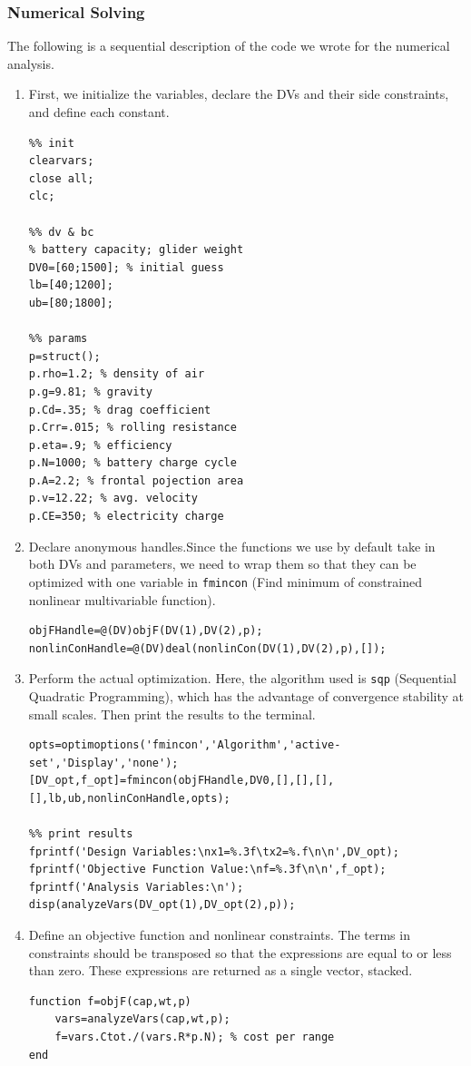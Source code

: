 \documentclass[11pt,twocolumn]{article}
\begin{document}
            \subsubsection{Numerical Solving}
                The following is a sequential description of the code we wrote for the numerical analysis.
                \begin{enumerate}
                    \item First, we initialize the variables, declare the DVs and their side constraints, and define each constant.
                    \begin{lstlisting}
%% init
clearvars;
close all;
clc;

%% dv & bc
% battery capacity; glider weight
DV0=[60;1500]; % initial guess
lb=[40;1200];
ub=[80;1800];

%% params
p=struct();
p.rho=1.2; % density of air
p.g=9.81; % gravity
p.Cd=.35; % drag coefficient
p.Crr=.015; % rolling resistance
p.eta=.9; % efficiency
p.N=1000; % battery charge cycle
p.A=2.2; % frontal pojection area
p.v=12.22; % avg. velocity
p.CE=350; % electricity charge
                    \end{lstlisting}
                    \item Declare anonymous handles.Since the functions we use by default take in both DVs and parameters, we need to wrap them so that they can be optimized with one variable in \texttt{fmincon} (Find minimum of constrained nonlinear multivariable function).
                    \begin{lstlisting}[firstnumber=last]
%% anonymous handles
objFHandle=@(DV)objF(DV(1),DV(2),p);
nonlinConHandle=@(DV)deal(nonlinCon(DV(1),DV(2),p),[]);
                    \end{lstlisting}
                    \item Perform the actual optimization. Here, the algorithm used is \texttt{sqp} (Sequential Quadratic Programming), which has the advantage of convergence stability at small scales. Then print the results to the terminal.
                    \begin{lstlisting}[firstnumber=last]
%% run optimization
opts=optimoptions('fmincon','Algorithm','active-set','Display','none');
[DV_opt,f_opt]=fmincon(objFHandle,DV0,[],[],[],[],lb,ub,nonlinConHandle,opts);

%% print results
fprintf('Design Variables:\nx1=%.3f\tx2=%.f\n\n',DV_opt);
fprintf('Objective Function Value:\nf=%.3f\n\n',f_opt);
fprintf('Analysis Variables:\n');
disp(analyzeVars(DV_opt(1),DV_opt(2),p));
                    \end{lstlisting}
                    \item Define an objective function and nonlinear constraints. The terms in constraints should be transposed so that the expressions are equal to or less than zero. These expressions are returned as a single vector, stacked.
                    \begin{lstlisting}[firstnumber=last]
%% def objective function
function f=objF(cap,wt,p)
    vars=analyzeVars(cap,wt,p);
    f=vars.Ctot./(vars.R*p.N); % cost per range
end


\end{lstlisting}
\end{enumerate}
\end{document}
